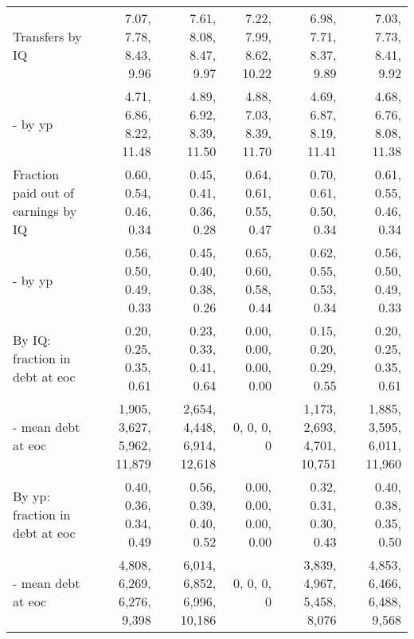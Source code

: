 \begin{tabular}{lrrrrr}
Transfers by IQ & 7.07, 7.78, 8.43, 9.96  & 7.61, 8.08, 8.47, 9.97  & 7.22, 7.99, 8.62, 10.22  & 6.98, 7.71, 8.37, 9.89  & 7.03, 7.73, 8.41, 9.92  \\ 
- by yp & 4.71, 6.86, 8.22, 11.48  & 4.89, 6.92, 8.39, 11.50  & 4.88, 7.03, 8.39, 11.70  & 4.69, 6.87, 8.19, 11.41  & 4.68, 6.76, 8.08, 11.38  \\ 
Fraction paid out of earnings by IQ & 0.60, 0.54, 0.46, 0.34  & 0.45, 0.41, 0.36, 0.28  & 0.64, 0.61, 0.55, 0.47  & 0.70, 0.61, 0.50, 0.34  & 0.61, 0.55, 0.46, 0.34  \\ 
- by yp & 0.56, 0.50, 0.49, 0.33  & 0.45, 0.40, 0.38, 0.26  & 0.65, 0.60, 0.58, 0.44  & 0.62, 0.55, 0.53, 0.34  & 0.56, 0.50, 0.49, 0.33  \\ 
By IQ: fraction in debt at eoc & 0.20, 0.25, 0.35, 0.61  & 0.23, 0.33, 0.41, 0.64  & 0.00, 0.00, 0.00, 0.00  & 0.15, 0.20, 0.29, 0.55  & 0.20, 0.25, 0.35, 0.61  \\ 
- mean debt at eoc & 1,905, 3,627, 5,962, 11,879  & 2,654, 4,448, 6,914, 12,618  & 0, 0, 0, 0  & 1,173, 2,693, 4,701, 10,751  & 1,885, 3,595, 6,011, 11,960  \\ 
By yp: fraction in debt at eoc & 0.40, 0.36, 0.34, 0.49  & 0.56, 0.39, 0.40, 0.52  & 0.00, 0.00, 0.00, 0.00  & 0.32, 0.31, 0.30, 0.43  & 0.40, 0.38, 0.35, 0.50  \\ 
- mean debt at eoc & 4,808, 6,269, 6,276, 9,398  & 6,014, 6,852, 6,996, 10,186  & 0, 0, 0, 0  & 3,839, 4,967, 5,458, 8,076  & 4,853, 6,466, 6,488, 9,568  \\ 
\hline
\end{tabular}%
